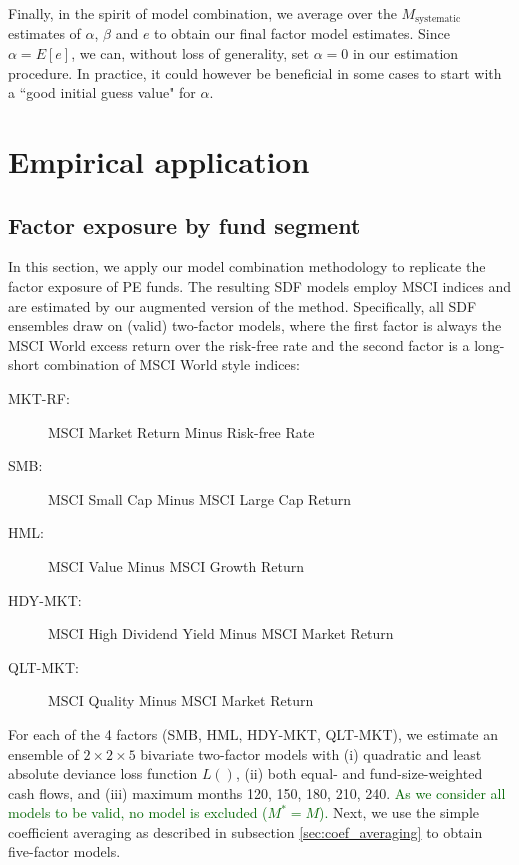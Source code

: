 \documentclass[12pt]{article}
\begin{document}
Finally, in the spirit of model combination, we average over the $M_{\mathrm{systematic}}$ estimates of $\alpha$, $\beta$ and $e$ to obtain our final factor model estimates.
Since $\alpha=E[e]$, we can, without loss of generality, set $\alpha=0$ in our estimation procedure.
In practice, it could however be beneficial in some cases to start with a ``good initial guess value" for $\alpha$.


\section{Empirical application}
\label{sec:applications}

\subsection{Factor exposure by fund segment}
\label{sec:factor_exposure}

In this section, we apply our model combination methodology to replicate the factor exposure of PE funds.
The resulting SDF models employ MSCI indices and are estimated by our augmented version of the \cite{DLP12} method.
Specifically, all SDF ensembles draw on (valid) two-factor models, where the first factor is always the MSCI World excess return over the risk-free rate and the second factor is a long-short combination of MSCI World style indices:
\begin{description}
	\item[MKT-RF:]{MSCI Market Return Minus Risk-free Rate}
	\item[SMB:]{MSCI Small Cap Minus MSCI Large Cap Return}
	\item[HML:]{MSCI Value Minus MSCI Growth Return}
	\item[HDY-MKT:]{MSCI High Dividend Yield Minus MSCI Market Return}
	\item[QLT-MKT:]{MSCI Quality Minus MSCI Market Return}
\end{description}
For each of the 4 factors (SMB, HML, HDY-MKT, QLT-MKT), we estimate an ensemble of $2 \times 2 \times 5$ bivariate two-factor models with (i) quadratic and least absolute deviance loss function $L()$, (ii) both equal- and fund-size-weighted cash flows, and (iii) maximum months 120, 150, 180, 210, 240.
\textcolor{darkgreen}{
	As we consider all models to be valid, no model is excluded ($M^*=M$).
}
Next, we use the simple coefficient averaging as described in subsection \ref{sec:coef_averaging} to obtain five-factor models.
\end{document}
